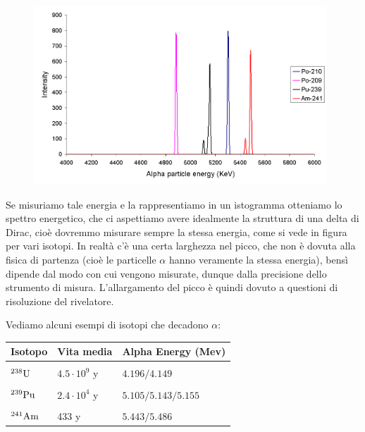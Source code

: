 \vspace{-0.5cm}\begin{figure}[H]
    \centering
    \includegraphics[width=11cm]{immagini/spettro_decadimento_alpha.png}
\end{figure}

\vspace{-0.5cm}Se misuriamo tale energia e la rappresentiamo in un istogramma otteniamo lo spettro energetico, che ci aspettiamo avere idealmente la struttura di una delta di Dirac, cioè dovremmo misurare sempre la stessa energia, come si vede in figura per vari isotopi. In realtà c'è una certa larghezza nel picco, che non è dovuta alla fisica di partenza (cioè le particelle $\alpha$ hanno veramente la stessa energia), bensì dipende dal modo con cui vengono misurate, dunque dalla precisione dello strumento di misura. L'allargamento del picco è quindi dovuto a questioni di risoluzione del rivelatore.

Vediamo alcuni esempi di isotopi che decadono $\alpha$:

\begin{center}
    \begin{tabular}{|l|l|l|}
        \hline
        Isotopo & Vita media & Alpha Energy (Mev)\\
        \hline
        &&\\[-0.45cm]
        $\rm ^{238}U$ & $4.5 \cdot 10^9$ y & $4.196/4.149$\\
        \hline
        &&\\[-0.45cm]
        $\rm ^{239}Pu$ & $2.4 \cdot 10^4$ y & $5.105/5.143/5.155$\\
        \hline
        &&\\[-0.45cm]
        $\rm ^{241}Am$ & 433 y & $5.443/5.486$\\
        \hline
    \end{tabular}
\end{center}

